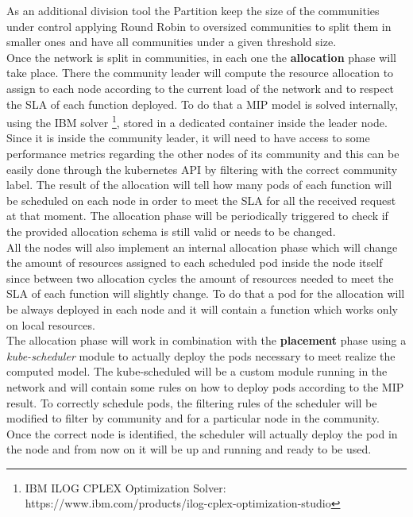 \begin{figure}[h]
    \centering
    \label{fig:pseudocode}
    \label{fig:communities}
\end{figure}

As an additional division tool the Partition keep the size of the communities under control
applying Round Robin to oversized communities to split them in smaller ones and have all 
communities under a given threshold size.\\

Once the network is split in communities, in each one the \textbf{allocation} phase will take
place. There the community leader will compute the resource allocation to assign to each node
according to the current load of the network and to respect the SLA of each function deployed.
To do that a MIP model is solved internally, using the IBM solver \footnote{IBM ILOG CPLEX 
Optimization Solver: https://www.ibm.com/products/ilog-cplex-optimization-studio}, stored in 
a dedicated container inside the leader node. Since it is inside the community leader, it 
will need to have access to some performance metrics regarding the other nodes of its community
and this can be easily done through the kubernetes API by filtering with the correct community
label. The result of the allocation will tell how many pods of each function will be scheduled
on each node in order to meet the SLA for all the received request at that moment.
The allocation phase will be periodically triggered to check if the provided allocation
schema is still valid or needs to be changed. \\
All the nodes will also implement an internal allocation phase which will change the amount 
of resources assigned to each scheduled pod inside the node itself since between two 
allocation cycles the amount of resources needed to meet the SLA of each function will 
slightly change. To do that a pod for the allocation will be always deployed in each node
and it will contain a function which works only on local resources.\\

The allocation phase will work in combination with the \textbf{placement} phase using a
\textit{kube-scheduler} module to actually deploy the pods necessary to meet realize the 
computed model. The kube-scheduled will be a custom module running in the network and will
contain some rules on how to deploy pods according to the MIP result. To correctly schedule 
pods, the filtering rules of the scheduler will be modified to filter by community and for 
a particular node in the community. Once the correct node is identified, the scheduler will 
actually deploy the pod in the node and from now on it will be up and running and ready to 
be used. \\


